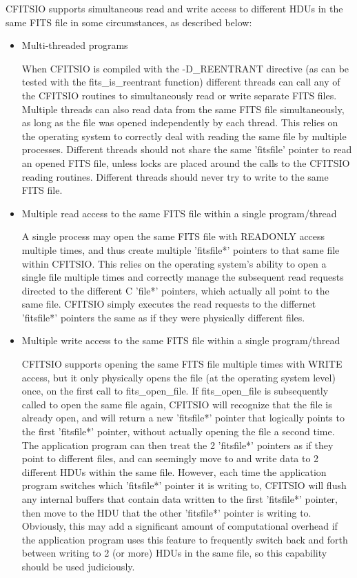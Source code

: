 \documentclass[11pt]{book}
\begin{document}
CFITSIO supports simultaneous read and write access to different
HDUs in the same FITS file in some circumstances, as described
below:

\begin{itemize}

\item
Multi-threaded programs

When CFITSIO is compiled with the -D\_REENTRANT directive (as can be
tested with the fits\_is\_reentrant function) different threads can
call any of the CFITSIO routines  to simultaneously read or write
separate  FITS files.  Multiple threads can also read data from the
same FITS file simultaneously, as long as the file was opened
independently by each thread.  This relies on the operating system
to correctly deal with reading the same file by multiple processes.
Different threads should not share the same 'fitsfile' pointer to
read an opened FITS file, unless locks are placed around the calls
to  the CFITSIO reading routines.  Different threads should  never
try to write to the same FITS file.

\item
Multiple read access to the same FITS file within a single
program/thread

A single process may open the same FITS file with READONLY access
multiple times, and thus create multiple 'fitsfile*' pointers to
that same file within CFITSIO. This relies on the operating system's
ability to open a single file multiple times and correctly manage
the subsequent read requests directed to the different C 'file*'
pointers, which actually all point to the same file.  CFITSIO simply
executes the read requests to the differnet 'fitsfile*' pointers the
same as if they were physically different files.

\item
Multiple write access to the same FITS file within a single
program/thread

CFITSIO supports opening the same FITS file multiple times with
WRITE access, but it only physically opens the file (at the
operating system level) once, on the first call to fits\_open\_file.
If fits\_open\_file is subsequently called to open the same file
again, CFITSIO will recognize that the file is already open, and
will return a new 'fitsfile*' pointer that logically points to the
first 'fitsfile*' pointer, without actually opening the file a
second time. The application program can then treat the 2
'fitsfile*' pointers as if they point to different files, and can
seemingly move to and write data to 2 different  HDUs within the
same file.  However, each time the application program switches
which 'fitsfile*' pointer it is writing to, CFITSIO will flush  any
internal buffers that contain data written to the first 'fitsfile*'
pointer,  then move to the HDU that the other 'fitsfile*' pointer
is writing to. Obviously, this may add a significant amount of
computational overhead if the  application program uses this feature
to frequently switch back and forth between writing to 2 (or more)
HDUs in the same file, so this capability should be used
judiciously.


\end{itemize}
\end{document}
